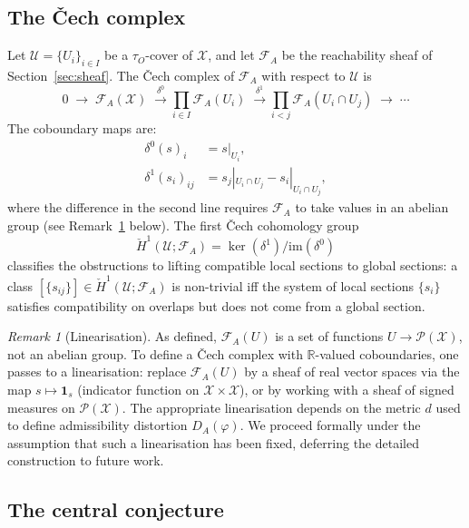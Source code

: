 \documentclass[11pt, a4paper]{article}
\theoremstyle{plain}
\theoremstyle{definition}
\theoremstyle{remark}
\newtheorem{remark}[theorem]{Remark}
\newcommand{\R}{\mathbb{R}}
\newcommand{\calX}{\mathcal{X}}
\newcommand{\calF}{\mathcal{F}}
\newcommand{\calP}{\mathcal{P}}
\newcommand{\DA}{D_{A}(\varphi)}
\newcommand{\im}{\mathrm{im}}
\begin{document}
\subsection{The \v{C}ech complex}

Let $\mathcal{U} = \{U_i\}_{i \in I}$ be a $\tau_O$-cover of $\calX$,
and let $\calF_A$ be the reachability sheaf of Section~\ref{sec:sheaf}.
The \v{C}ech complex of $\calF_A$ with respect to $\mathcal{U}$ is
\begin{equation}
\label{eq:cech}
  0 \;\longrightarrow\; \calF_A(\calX)
  \;\xrightarrow{\;\delta^0\;}
  \prod_{i \in I} \calF_A(U_i)
  \;\xrightarrow{\;\delta^1\;}
  \prod_{i < j} \calF_A(U_i \cap U_j)
  \;\longrightarrow\; \cdots
\end{equation}
The coboundary maps are:
\begin{align*}
  \delta^0(s)_i &= s|_{U_i}, \\
  \delta^1(s_i)_{ij} &= s_j|_{U_i \cap U_j} - s_i|_{U_i \cap U_j},
\end{align*}
where the difference in the second line requires $\calF_A$ to take values in
an abelian group (see Remark~\ref{rem:linearisation} below). The first
\v{C}ech cohomology group
\[
  \check{H}^1(\mathcal{U}; \calF_A) = \ker(\delta^1) / \im(\delta^0)
\]
classifies the obstructions to lifting compatible local sections to global sections:
a class $[\{s_{ij}\}] \in \check{H}^1(\mathcal{U}; \calF_A)$ is non-trivial
iff the system of local sections $\{s_i\}$ satisfies compatibility on overlaps
but does not come from a global section.

\begin{remark}[Linearisation]
\label{rem:linearisation}
As defined, $\calF_A(U)$ is a set of functions $U \to \calP(\calX)$, not
an abelian group. To define a \v{C}ech complex with $\R$-valued coboundaries,
one passes to a linearisation: replace $\calF_A(U)$ by a sheaf of real vector
spaces via the map $s \mapsto \mathbf{1}_s$ (indicator function on
$\calX \times \calX$), or by working with a sheaf of signed measures on
$\calP(\calX)$. The appropriate linearisation depends on the metric $d$
used to define admissibility distortion $\DA$. We proceed formally under the
assumption that such a linearisation has been fixed, deferring the detailed
construction to future work.
\end{remark}

\subsection{The central conjecture}
\end{document}

